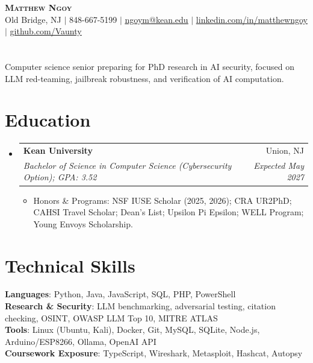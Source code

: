 \documentclass[letterpaper,11pt]{article}
\makeatletter
\newcommand{\resumeItem}[1]{
  \item\small{#1}
}
\newcommand{\resumeSubheading}[4]{
  \vspace{-1pt}\item
    \begin{tabular*}{0.97\textwidth}[t]{l@{\extracolsep{\fill}}r}
      {\normalsize\textbf{#1}} & {\normalsize #2} \\
      \textit{\small#3} & \textit{\small #4} \\
    \end{tabular*}\vspace{-7pt}
}
\newcommand{\resumeSubHeadingListStart}{\begin{itemize}[leftmargin=0.15in, label={}, topsep=0pt, partopsep=0pt, itemsep=0pt]\small}
\newcommand{\resumeSubHeadingListEnd}{\end{itemize}}
\newcommand{\resumeItemListStart}{\begin{itemize}[topsep=1pt, itemsep=-2pt, parsep=0pt]}
\newcommand{\resumeItemListEnd}{\end{itemize}\vspace{-6pt}}
\makeatother
\begin{document}
\begin{center}
    \textbf{\Huge \scshape Matthew Ngoy} \\ \vspace{2pt}
    \small Old Bridge, NJ $|$ 848-667-5199 $|$
    \href{mailto:ngoym@kean.edu}{\underline{ngoym@kean.edu}} $|$
    \href{https://www.linkedin.com/in/matthewngoy/}{\underline{linkedin.com/in/matthewngoy}} $|$
    \href{https://github.com/Vaunty}{\underline{github.com/Vaunty}}
\end{center}\vspace{-4pt}

\section{}
{\centering\small Computer science senior preparing for PhD research in AI security, focused on LLM red-teaming, jailbreak robustness, and verification of AI computation.\par}

\section{Education}
  \resumeSubHeadingListStart
    \resumeSubheading
      {Kean University}{Union, NJ}
      {Bachelor of Science in Computer Science (Cybersecurity Option); GPA: 3.52}{Expected May 2027}
      \resumeItemListStart
        \resumeItem{Honors \& Programs: NSF IUSE Scholar (2025, 2026); CRA UR2PhD; CAHSI Travel Scholar; Dean's List; Upsilon Pi Epsilon; WELL Program; Young Envoys Scholarship.}
      \resumeItemListEnd
  \resumeSubHeadingListEnd

\section{Technical Skills}
 \begin{itemize}[leftmargin=0.15in, label={}, topsep=0pt, partopsep=0pt, parsep=0pt, itemsep=0pt]
    \small{\item{
     \textbf{Languages}{: Python, Java, JavaScript, SQL, PHP, PowerShell} \\
     \textbf{Research \& Security}{: LLM benchmarking, adversarial testing, citation checking, OSINT, OWASP LLM Top 10, MITRE ATLAS} \\
     \textbf{Tools}{: Linux (Ubuntu, Kali), Docker, Git, MySQL, SQLite, Node.js, Arduino/ESP8266, Ollama, OpenAI API} \\
     \textbf{Coursework Exposure}{: TypeScript, Wireshark, Metasploit, Hashcat, Autopsy}
    }}
 \end{itemize}
\end{document}
